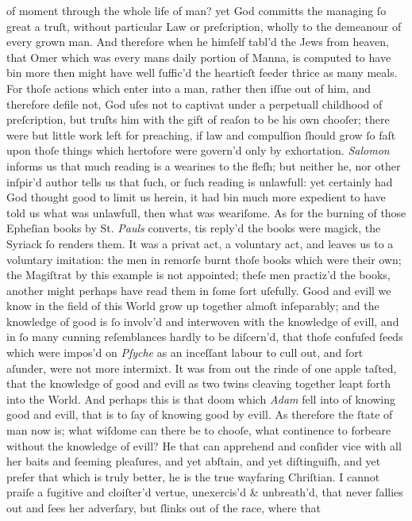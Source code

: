 of moment through the whole life of man? yet God committs the managing ſo great
a truſt, without particular Law or preſcription, wholly to the demeanour of
every grown man.  And therefore when he himſelf tabl'd the Jews from heaven,
that Omer which was every mans daily portion of Manna, is computed to have bin
more then might have well ſuffic'd the heartieſt feeder thrice as many meals.
For thoſe actions which enter into a man, rather then iſſue out of him, and
therefore defile not, God uſes not to captivat under a perpetuall childhood of
preſcription, but truſts him with the gift of reaſon to be his own chooſer;
there were but little work left for preaching, if law and compulſion ſhould grow
ſo faſt upon thoſe things which hertofore were govern'd only by exhortation.
\textit{Salomon} informs us that much reading is a wearines to the fleſh; but
neither he, nor other inſpir'd author tells us that ſuch, or ſuch reading is
unlawfull: yet certainly had God thought good to limit us herein, it had bin
much more expedient to have told us what was unlawfull, then what was weariſome.
As for the burning of those Epheſian books by St. \textit{Pauls} converts, tis
reply'd the books were magick, the Syriack ſo renders them.  It was a privat
act, a voluntary act, and leaves us to a voluntary imitation: the men in remorſe
burnt thoſe books which were their own; the Magiſtrat by this example is not
appointed; theſe men practiz'd the books, another might perhaps have read them
in ſome ſort uſefully.  Good and evill we know in the field of this World grow
up together almoſt inſeparably; and the knowledge of good is ſo involv'd and
interwoven with the knowledge of evill, and in ſo many cunning reſemblances
hardly to be diſcern'd, that thoſe confuſed ſeeds which were impos'd on
\textit{Pſyche} as an inceſſant labour to cull out, and ſort aſunder, were not
more intermixt.  It was from out the rinde of one apple taſted, that the
knowledge of good and evill as two twins cleaving together leapt forth into the
World.  And perhaps this is that doom which \textit{Adam} fell into of knowing
good and evill, that is to ſay of knowing good by evill.  As therefore the ſtate
of man now is; what wiſdome can there be to chooſe, what continence to forbeare
without the knowledge of evill?  He that can apprehend and conſider vice with
all her baits and ſeeming pleaſures, and yet abſtain, and yet diſtinguiſh, and
yet prefer that which is truly better, he is the true wayfaring Chriſtian.  I
cannot praiſe a fugitive and cloiſter'd vertue, unexercis'd \& unbreath'd, that
never ſallies out and ſees her adverſary, but ſlinks out of the race, where that
